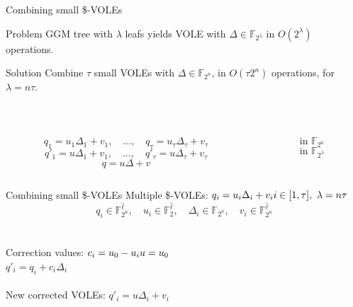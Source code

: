 \begin{frame}{Combining small \$-VOLEs}
  \begin{alertblock}{Problem}
    GGM tree with $\lambda$ leafs yields VOLE with $\Delta\in \mathbb{F}_{2^\lambda}$ in $O(2^\lambda)$ operations.
  \end{alertblock}
  \pause
  \begin{block}{Solution}
    Combine $\tau$ small VOLEs with $\Delta\in \mathbb{F}_{2^n}$, in $O(\tau2^n)$ operations, for $\lambda=n\tau$.
  \end{block}
  \ \\
  \begin{columns}
    \begin{column}{0.7\textwidth}
      \begin{overprint}
          $$q_1=u_1\Delta_1+v_1,\quad\ldots,\quad q_\tau=u_\tau\Delta_\tau+v_\tau$$
          $$q'_1=u\Delta_1+v_1,\quad\ldots,\quad q'_\tau=u\Delta_\tau+v_\tau$$
          $$q=u\Delta+v$$
      \end{overprint}
    \end{column}
    \hspace{-7em}
    \begin{column}{0.01\textwidth}
      \vspace{-2em}
      \begin{overprint}
          $$\text{in }\mathbb{F}_{2^n}$$
          $$\text{in }\mathbb{F}_{2^\lambda}$$
      \end{overprint}
    \end{column}
  \end{columns}
\end{frame}


\begin{frame}{Combining small \$-VOLEs}
  Multiple \$-VOLEs: $q_i=u_i\Delta_i+v_i\hfill i\in [1,\tau],\ \lambda=n\tau$\\
  $$q_i\in \mathbb{F}_{2^n}^{\hat{\ell}},\quad u_i\in \mathbb{F}_2^{\hat{\ell}},\quad\Delta_i\in \mathbb{F}_{2^n},\quad v_i\in \mathbb{F}_{2^n}^{\hat{\ell}}$$
  \ \\\ \\\pause
  Correction values: $c_i=u_0-u_i\hfill u=u_0$\\
  \hphantom{Correction values:} $q'_i=q_i+c_i\Delta_i$\\
  \ \\
  New corrected VOLEs: $q'_i=u\Delta_i+v_i$
\end{frame}



